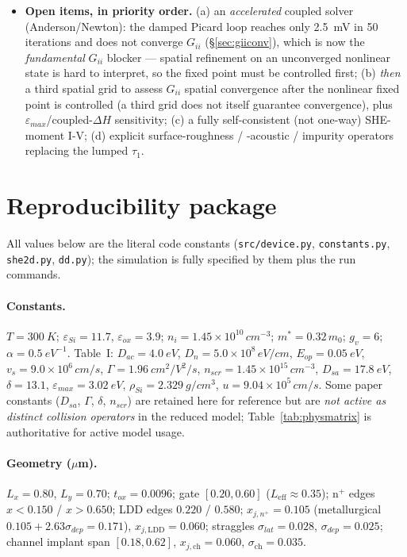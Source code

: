 \documentclass[11pt]{article}
\newcommand{\eps}{\varepsilon}
\begin{document}
\begin{itemize}[leftmargin=1.4em,itemsep=2pt]
(Fig.~\ref{fig:ivmoment}, Table~\ref{tab:f8}) --- terminal current from the SHE face flux, as in
Liang, with source/drain conservation $\le10^{-3}$ --- upgrading Fig.~8 from a DD shape check to a
demonstrated (if not yet self-consistent) reproduction of Liang's I-V method.
\item \textbf{Open items, in priority order.} (a) an \emph{accelerated} coupled solver
(Anderson/Newton): the damped Picard loop reaches only \SI{2.5}{mV} in 50 iterations and does not
converge $G_{ii}$ (\S\ref{sec:giiconv}), which is now the \emph{fundamental} $G_{ii}$ blocker ---
spatial refinement on an unconverged nonlinear state is hard to interpret, so the fixed point must
be controlled first; (b) \emph{then} a third spatial grid to assess $G_{ii}$ spatial convergence
after the nonlinear fixed point is controlled (a third grid does not itself guarantee convergence),
plus $\eps_{max}$/coupled-$\Delta H$ sensitivity; (c) a fully self-consistent (not one-way) SHE-moment
I-V; (d) explicit surface-roughness / -acoustic / impurity operators replacing the lumped $\tau_1$.
\end{itemize}

\appendix
\section{Reproducibility package}\label{sec:specs}
All values below are the literal code constants (\texttt{src/device.py}, \texttt{constants.py},
\texttt{she2d.py}, \texttt{dd.py}); the simulation is fully specified by them plus the run commands.

\paragraph{Constants.} $T=\SI{300}{K}$; $\eps_{Si}=11.7$, $\eps_{ox}=3.9$;
$n_i=1.45\times10^{10}\,\si{cm^{-3}}$; $m^*=0.32\,m_0$; $g_v=6$; $\alpha=\SI{0.5}{eV^{-1}}$.
Table~I: $D_{ac}=\SI{4.0}{eV}$, $D_n=5.0\times10^{8}\,\si{eV/cm}$, $E_{op}=\SI{0.05}{eV}$,
$v_s=9.0\times10^{6}\,\si{cm/s}$, $\Gamma=\SI{1.96}{cm^2/V^2/s}$,
$n_{scr}=1.45\times10^{15}\,\si{cm^{-3}}$, $D_{sa}=\SI{17.8}{eV}$, $\delta=13.1$,
$\eps_{max}=\SI{3.02}{eV}$, $\rho_{Si}=\SI{2.329}{g/cm^3}$, $u=9.04\times10^{5}\,\si{cm/s}$.
Some paper constants ($D_{sa}$, $\Gamma$, $\delta$, $n_{scr}$) are retained here for reference but
are \emph{not active as distinct collision operators} in the reduced model; Table~\ref{tab:physmatrix}
is authoritative for active model usage.

\paragraph{Geometry ($\mu$m).} $L_x=0.80$, $L_y=0.70$; $t_{ox}=0.0096$; gate $[0.20,0.60]$
($L_{\text{eff}}\!\approx\!0.35$); n$^+$ edges $x{<}0.150$ / $x{>}0.650$; LDD edges $0.220$ /
$0.580$; $x_{j,n^+}=0.105$ (metallurgical $0.105{+}2.63\sigma_{dep}=0.171$),
$x_{j,\text{LDD}}=0.060$; straggles $\sigma_{lat}=0.028$, $\sigma_{dep}=0.025$; channel implant
span $[0.18,0.62]$, $x_{j,\text{ch}}=0.060$, $\sigma_{\text{ch}}=0.035$.
\end{document}
